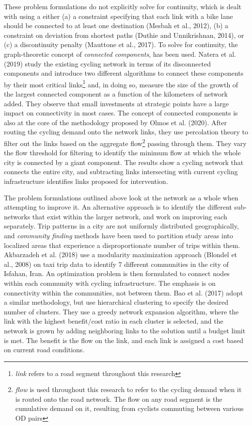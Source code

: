 \documentclass[]{elsarticle} %
\begin{document}
These problem formulations do not explicitly solve for continuity, which
is dealt with using a either (a) a constraint specifying that each link
with a bike lane should be connected to at least one destination (Mesbah
et al., 2012), (b) a constraint on deviation from shortest paths (Duthie
and Unnikrishnan, 2014), or (c) a discontinuity penalty (Mauttone et
al., 2017). To solve for continuity, the graph-theoretic concept of
\emph{connected components}, has been used. Natera et al. (2019) study
the existing cycling network in terms of its disconnected components and
introduce two different algorithms to connect these components by their
most critical
links\footnote{\textit{link} refers to a road segment throughout this research}
and, in doing so, measure the size of the growth of the largest
connected component as a function of the kilometers of network added.
They observe that small investments at strategic points have a large
impact on connectivity in most cases. The concept of connected
components is also at the core of the methodology proposed by Olmos et
al. (2020). After routing the cycling demand onto the network links,
they use percolation theory to filter out the links based on the
aggregate
flow\footnote{\textit{flow} is used throughout this research to refer to the cycling demand when it is routed onto the road network. The flow on any road segment is the cumulative demand on it, resulting from cyclists commuting between various OD pairs}
passing through them. They vary the flow threshold for filtering to
identify the minimum flow at which the whole city is connected by a
giant component. The results show a cycling network that connects the
entire city, and subtracting links intersecting with current cycling
infrastructure identifies links proposed for intervention.

\vspace{0.3cm}

The problem formulations outlined above look at the network as a whole
when attempting to improve it. An alternative approach is to identify
the different sub-networks that exist within the larger network, and
work on improving each separately. Trip patterns in a city are not
uniformly distributed geographically, and \emph{community finding}
methods have been used to partition study areas into localized areas
that experience a disproportionate number of trips within them.
Akbarzadeh et al. (2018) use a modularity maximization approach (Blondel
et al., 2008) on taxi trip data to identify 7 different communities in
the city of Isfahan, Iran. An optimization problem is then formulated to
connect nodes within each community with cycling infrastructure. The
emphasis is on connectivity within the communities, not between them.
Bao et al. (2017) adopt a similar methodology, but use hierarchical
clustering to specify the desired number of clusters. They use a greedy
network expansion algorithm, where the link with the highest
benefit/cost ratio in each cluster is selected, and the network is grown
by adding neighboring links to the solution until a budget limit is met.
The benefit is the flow on the link, and each link is assigned a cost
based on current road conditions.
\end{document}
